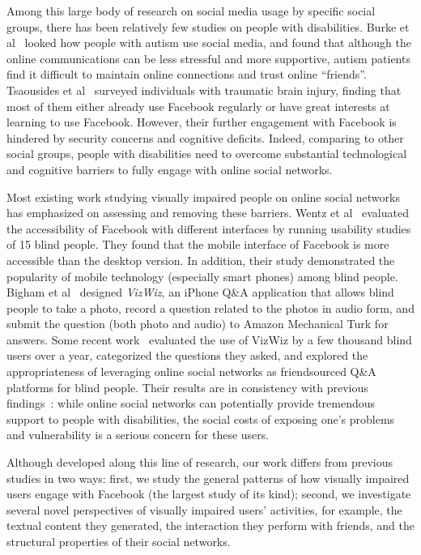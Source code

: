 \documentclass{sigchi}
\begin{document}

Among this large body of research on social media usage by specific social groups, there has been relatively few studies on people with disabilities. Burke et al~\cite{burke:2010} looked how people with autism use social media, and found that although the online communications can be less stressful and more supportive, autism patients find it difficult to maintain online connections and trust online ``friends''. Tsaousides et al~\cite{tsaousides2011} surveyed individuals with traumatic brain injury, finding that most of them either already use Facebook regularly or have great interests at learning to use Facebook. However, their further engagement with Facebook is hindered by security concerns and cognitive deficits. Indeed, comparing to other social groups, people with disabilities need to overcome substantial technological and cognitive barriers to fully engage with online social networks. 

Most existing work studying visually impaired people on online social networks has emphasized on assessing and removing these barriers. Wentz et al~\cite{wentz2011} evaluated the accessibility of Facebook with different interfaces by running usability studies of 15 blind people. They found that   the mobile interface of Facebook is more accessible than the desktop version. In addition, their study demonstrated the popularity of mobile technology (especially smart phones) among blind people.   Bigham et al~\cite{bigham2010} designed \emph{VizWiz}, an iPhone  Q\&A application that allows blind people to take a photo, record a question related to the photos in audio form, and submit the question (both photo and audio) to Amazon Mechanical Turk for answers. Some recent work~\cite{brady2013chi, brady2013cscw} evaluated the use of VizWiz by a few thousand blind users over a year, categorized the questions they asked, and explored the appropriateness of leveraging online social networks as friendsourced Q\&A platforms for blind people. Their results are in consistency with previous findings~\cite{burke:2010,tsaousides2011}: while online social networks can potentially provide tremendous support to people with disabilities, the social costs of exposing one's problems and vulnerability is a serious concern for these users. 

Although developed along this line of research, our work differs from previous studies in two ways: first, we study  the general patterns of how visually impaired users engage with Facebook (the largest study of its kind);  second, we investigate several novel perspectives of visually impaired users' activities, for example, the textual content they generated, the interaction they perform with friends, and the structural properties of their social networks. 
\end{document}
